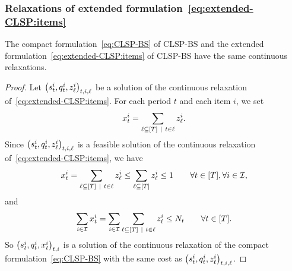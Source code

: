 \subsubsection{Relaxations of extended formulation~\eqref{eq:extended-CLSP:items}}


\begin{prop}\label{prop:extended-relaxation:items}
The compact formulation~\eqref{eq:CLSP-BS} of CLSP-BS and the extended formulation~\eqref{eq:extended-CLSP:items} of CLSP-BS have the same continuous relaxations.
\end{prop}


\begin{proof}
Let $\bracket{\inventory_t^i, \quantity_t^i, z_{\ell}^i}_{t,i,\ell}$ be a solution of the continuous relaxation of~\eqref{eq:extended-CLSP:items}.
For each period $t$ and each item $i$, we set
\begin{equation}
  \setup_t^i=\sum_{\ell\subseteq\range{\horizon}~|~t\in\ell} z_{\ell}^i.
\end{equation}
Since $\bracket{\inventory_t^i, \quantity_t^i, z_{\ell}^i}_{t,i,\ell}$ is a feasible solution of the continuous relaxation of~\eqref{eq:extended-CLSP:items}, we have
\begin{equation}
\setup_t^i
= \sum_{\ell\subseteq\range{\horizon}~|~t\in\ell} z_{\ell}^i
\le \sum_{\ell\subseteq\range{\horizon}} z_{\ell}^i
\le 1
\qquad \forall t\in\range{\horizon},\forall i\in\REF,
\end{equation}
and
\begin{equation}
\sum_{i\in\REF}\setup_t^i
= \sum_{i\in\REF}\sum_{\ell\subseteq\range{\horizon}~|~t\in\ell} z_{\ell}^i
\le \nbsetups_t
\qquad \forall t\in\range{\horizon}.
\end{equation}
So $\bracket{\inventory_t^i, \quantity_t^i, \setup_t^i}_{t,i}$  is a solution of the continuous relaxation of the compact formulation~\eqref{eq:CLSP-BS} with the same cost as $\bracket{\inventory_t^i, \quantity_t^i, z_{\ell}^i}_{t,i,\ell}$.



\end{proof}
